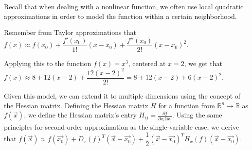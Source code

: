 


Recall that when dealing with a nonlinear function, we often use local quadratic approximations in order to model the function within a certain neighborhood.

Remember from Taylor approximations that $f(x)\approx f(x_0) + \dfrac{f'(x_0)}{1!} (x - x_0) +   \dfrac{f''(x_0)}{2!} (x - x_0) ^ {2} $.

Applying this to the function $f(x) = x^{3}$, centered at $x = 2$, we get that $f(x)\approx 8 + 12(x - 2) + \dfrac{12(x - 2)^{2}}{2!} = 8 + 12(x - 2) + 6(x - 2)^{2}$.

\begin{center}
\end{center}


Given this model, we can extend it to multiple dimensions using the concept of the Hessian matrix. Defining the Hessian matrix ${H}$ for a function from 
$\mathbb{R}^{n} \rightarrow \mathbb{R}$ as $f(\vec{x})$, we define the Hessian matrix's entry $H_{ij} = \frac{\partial f}{{\partial x_i}{\partial x_j}}$. Using the same principles for second-order approximation as the single-variable case, we derive that \newline $f(\vec{x})\approx f(\vec{x_0}) + D_x(f) ^ {T} (\vec{x} - \vec{x_0})+ \dfrac{1}{2} (\vec{x} - \vec{x_0})^{T} H_x(f) (\vec{x} - \vec{x_0})$.\newline


